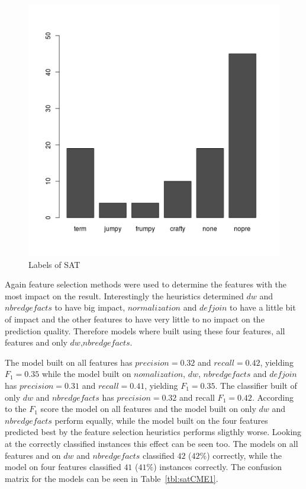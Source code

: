 \begin{figure}[h]
	\center
	\includegraphics[scale=0.4]{figures/satLabels.png}
	\caption{Labels of SAT\label{fig:satLabelsE1}}
\end{figure}

\par Again feature selection methods were used to determine the features with the most impact on the result. Interestingly the heuristics determined $dw$ and $nbredgefacts$ to have big impact, $normalization$ and $defjoin$ to have a little bit of impact and the other features to have very little to no impact on the prediction quality. Therefore models where built using these four features, all features  and only $dw$,$nbredgefacts$.

The model built on all features has $precision=0.32$ and $recall=0.42$, yielding $F_1=0.35$ while the model built on $nomalization$, $dw$, $nbredgefacts$ and $defjoin$ has $precision=0.31$ and $recall=0.41$, yielding $F_1 =0.35$. The classifier built of only $dw$ and $nbredgefacts$ has $precision=0.32$ and recall $F_1=0.42$. According to the $F_1$ score the model on all features and the model built on only $dw$ and $nbredgefacts$ perform equally, while the model built on the four features predicted best by the feature selection heuristics performs sligthly worse. Looking at the correctly classified instances this effect can be seen too. The models on all features and on $dw$ and $nbredgefacts$ classified $42$ ($42\%$) correctly, while the model on four features classified $41$ ($41\%$) instances correctly. The confusion matrix for the models can be seen in Table~\ref{tbl:satCME1}.


